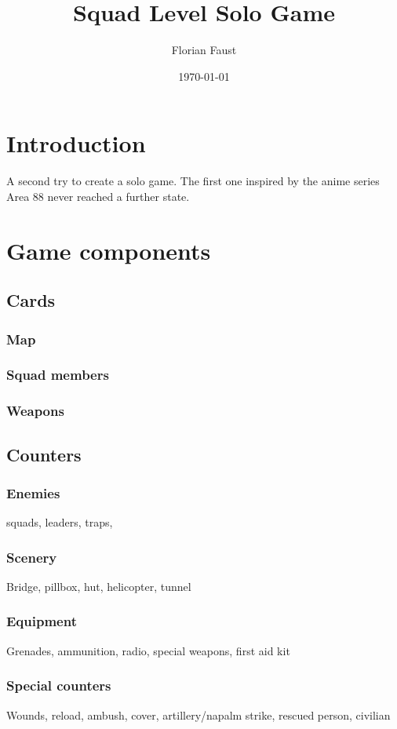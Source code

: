 \documentclass[twocolumn,titlepage]{article}
\title{Squad Level Solo Game}
\author{Florian Faust}
\date{\today}
\begin{document}
 
\maketitle
\section*{Introduction}
A second try to create a solo game. The first one inspired by the anime series Area 88 never reached a further state.
\setcounter{tocdepth}{2}
\tableofcontents
\newpage
\section{Game components}

\subsection{Cards}
\subsubsection{Map}
\subsubsection{Squad members}
\subsubsection{Weapons}
\subsection{Counters}
\subsubsection{Enemies}
squads, leaders, traps, 
\subsubsection{Scenery}
Bridge, pillbox, hut, helicopter, tunnel
\subsubsection{Equipment}
Grenades, ammunition, radio, special weapons, first aid kit
\subsubsection{Special counters}
Wounds, reload, ambush, cover, artillery/napalm strike, rescued person, civilian
\end{document}
